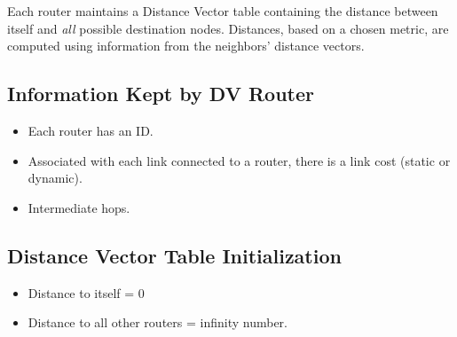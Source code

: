 \documentclass{korigamik}
\begin{document}
	Each router maintains a Distance Vector table containing the distance between
	itself and \textit{all} possible destination nodes. Distances, based on a
	chosen metric, are computed using information from the neighbors' distance
	vectors.


	\subsection{Information Kept by DV Router}
	\begin{itemize}
		\item Each router has an ID.
		\item Associated with each link connected to a router, there is a link cost
		      (static or dynamic).
		\item Intermediate hops.
	\end{itemize}

	\subsection{Distance Vector Table Initialization}
	\begin{itemize}
		\item Distance to itself = 0
		\item Distance to all other routers = infinity number.
	\end{itemize}
\end{document}

